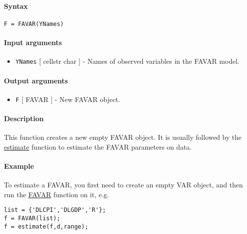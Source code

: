 


	\paragraph{Syntax}\label{syntax}

\begin{verbatim}
F = FAVAR(YNames)
\end{verbatim}

\paragraph{Input arguments}\label{input-arguments}

\begin{itemize}
\itemsep1pt\parskip0pt
\item
  \texttt{YNames} {[} cellstr \textbar{} char {]} - Names of observed
  variables in the FAVAR model.
\end{itemize}

\paragraph{Output arguments}\label{output-arguments}

\begin{itemize}
\itemsep1pt\parskip0pt
\item
  \texttt{F} {[} FAVAR {]} - New FAVAR object.
\end{itemize}

\paragraph{Description}\label{description}

This function creates a new empty FAVAR object. It is usually followed
by the \href{FAVAR/estimate}{estimate} function to estimate the FAVAR
parameters on data.

\paragraph{Example}\label{example}

To estimate a FAVAR, you first need to create an empty VAR object, and
then run the \href{FAVAR/estimate}{FAVAR} function on it, e.g.

\begin{verbatim}
list = {'DLCPI','DLGDP','R'};
f = FAVAR(list);
f = estimate(f,d,range);
\end{verbatim}


